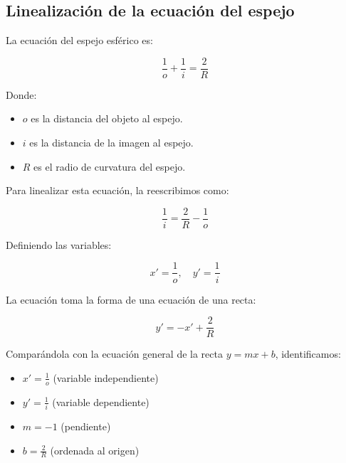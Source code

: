 \documentclass[article,12pt]{elsarticle}
\begin{document}
\subsection{Linealización de la ecuación del espejo}
La ecuación del espejo esférico es:

\begin{mdframed}
\begin{equation}
    \frac{1}{o} + \frac{1}{i} = \frac{2}{R}
\end{equation}
\end{mdframed}

Donde:
\begin{itemize}
    \item $o$ es la distancia del objeto al espejo.
    \item $i$ es la distancia de la imagen al espejo.
    \item $R$ es el radio de curvatura del espejo.
\end{itemize}
Para linealizar esta ecuación, la reescribimos como:
\begin{mdframed}
\begin{equation}
    \frac{1}{i} = \frac{2}{R} - \frac{1}{o}
\end{equation}
\end{mdframed}
Definiendo las variables:

\begin{mdframed}
\begin{equation}
    x' = \frac{1}{o}, \quad y' = \frac{1}{i}
\end{equation}
\end{mdframed}

La ecuación toma la forma de una ecuación de una recta:
\begin{mdframed}
\begin{equation}
    y' = -x' + \frac{2}{R}
\end{equation}
\end{mdframed}
Comparándola con la ecuación general de la recta $y = mx + b$, identificamos:
\begin{itemize}
    \item $x' = \frac{1}{o}$ (variable independiente)
    \item $y' = \frac{1}{i}$ (variable dependiente)
    \item $m = -1$ (pendiente)
    \item $b = \frac{2}{R}$ (ordenada al origen)
\end{itemize}
\end{document}
